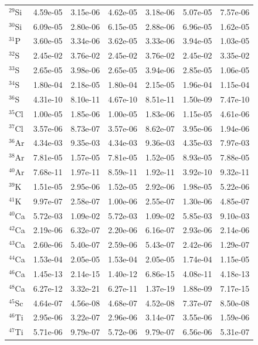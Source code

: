\begin{table}
\begin{tabular}{l|cc|cc|cc}
$^{29}$Si & 4.59e-05 & 3.15e-06 & 4.62e-05 & 3.18e-06 & 5.07e-05 & 7.57e-06\\
$^{30}$Si & 6.09e-05 & 2.80e-06 & 6.15e-05 & 2.88e-06 & 6.96e-05 & 1.62e-05\\
$^{31}$P & 3.60e-05 & 3.34e-06 & 3.62e-05 & 3.33e-06 & 3.94e-05 & 1.03e-05\\
$^{32}$S & 2.45e-02 & 3.76e-02 & 2.45e-02 & 3.76e-02 & 2.45e-02 & 3.35e-02\\
$^{33}$S & 2.65e-05 & 3.98e-06 & 2.65e-05 & 3.94e-06 & 2.85e-05 & 1.06e-05\\
$^{34}$S & 1.80e-04 & 2.18e-05 & 1.80e-04 & 2.15e-05 & 1.96e-04 & 1.15e-04\\
$^{36}$S & 4.31e-10 & 8.10e-11 & 4.67e-10 & 8.51e-11 & 1.50e-09 & 7.47e-10\\
$^{35}$Cl & 1.00e-05 & 1.85e-06 & 1.00e-05 & 1.83e-06 & 1.15e-05 & 4.61e-06\\
$^{37}$Cl & 3.57e-06 & 8.73e-07 & 3.57e-06 & 8.62e-07 & 3.95e-06 & 1.94e-06\\
$^{36}$Ar & 4.34e-03 & 9.35e-03 & 4.34e-03 & 9.36e-03 & 4.35e-03 & 7.97e-03\\
$^{38}$Ar & 7.81e-05 & 1.57e-05 & 7.81e-05 & 1.52e-05 & 8.93e-05 & 7.88e-05\\
$^{40}$Ar & 7.68e-11 & 1.97e-11 & 8.59e-11 & 1.92e-11 & 3.92e-10 & 9.32e-11\\
$^{39}$K & 1.51e-05 & 2.95e-06 & 1.52e-05 & 2.92e-06 & 1.98e-05 & 5.22e-06\\
$^{41}$K & 9.97e-07 & 2.58e-07 & 1.00e-06 & 2.55e-07 & 1.30e-06 & 4.85e-07\\
$^{40}$Ca & 5.72e-03 & 1.09e-02 & 5.72e-03 & 1.09e-02 & 5.85e-03 & 9.10e-03\\
$^{42}$Ca & 2.19e-06 & 6.32e-07 & 2.20e-06 & 6.16e-07 & 2.93e-06 & 2.14e-06\\
$^{43}$Ca & 2.60e-06 & 5.40e-07 & 2.59e-06 & 5.43e-07 & 2.42e-06 & 1.29e-07\\
$^{44}$Ca & 1.53e-04 & 2.05e-05 & 1.53e-04 & 2.05e-05 & 1.74e-04 & 1.15e-05\\
$^{46}$Ca & 1.45e-13 & 2.14e-15 & 1.40e-12 & 6.86e-15 & 4.08e-11 & 4.18e-13\\
$^{48}$Ca & 6.27e-12 & 3.32e-21 & 6.27e-11 & 1.37e-19 & 1.88e-09 & 7.17e-15\\
$^{45}$Sc & 4.64e-07 & 4.56e-08 & 4.68e-07 & 4.52e-08 & 7.37e-07 & 8.50e-08\\
$^{46}$Ti & 2.95e-06 & 3.22e-07 & 2.96e-06 & 3.14e-07 & 3.55e-06 & 1.59e-06\\
$^{47}$Ti & 5.71e-06 & 9.79e-07 & 5.72e-06 & 9.79e-07 & 6.56e-06 & 5.31e-07\\

\end{tabular}
\end{table}
